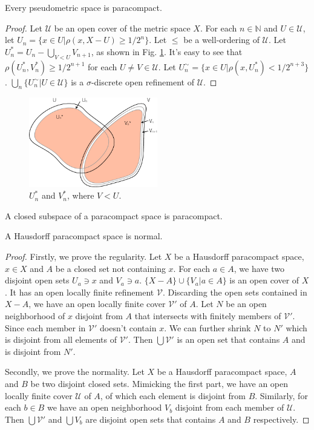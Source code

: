 \documentclass[12pt]{book}
\begin{document}
\begin{theorem}[Stone]
	Every pseudometric space is paracompact.
	\label{thm:paracomp}
\end{theorem}
\begin{proof}
	Let $\mathcal U$ be an open cover of the metric space $X$. For each $n\in\mathbb N$ and $U\in\mathcal U$, let $U_n=\{x\in U|\rho(x,X-U)\geq 1/2^n\}$. Let $\leq$ be a well-ordering of $\mathcal U$. Let $U^*_n=U_n-\bigcup_{V<U}V_{n+1}$, as shown in Fig. \ref{fig:paracompact}. It's easy to see that $\rho(U^*_n,V^*_n)\geq 1/2^{n+1}$ for each $U\neq V\in\mathcal U$. Let $U_n^\sim=\{x\in U|\rho(x,U_n^*)< 1/2^{n+3}\}$. $\bigcup_n\{U_n^\sim|U\in\mathcal U\}$ is a $\sigma$-discrete open refinement of $\mathcal U$.
\end{proof}
\begin{figure}[htb!]
	\centering  
	\includegraphics[width=0.5\textwidth ]{resources/chap_compact/paracompact.pdf}  
	\caption{$U^*_n$ and $V^*_n$, where $V<U$.}
	\label{fig:paracompact}
\end{figure}

\begin{theorem}
	A closed subspace of a paracompact space is paracompact.
\end{theorem}

\begin{theorem}
	A Hausdorff paracompact space is normal.
\end{theorem}
\begin{proof}
	Firstly, we prove the regularity. Let $X$ be a Hausdorff paracompact space, $x\in X$ and $A$ be a closed set not containing $x$. For each $a\in A$, we have two disjoint open sets $U_a\ni x$ and $V_a\ni a$. $\{X-A\}\cup\{V_a|a\in A\}$ is an open cover of $X$. It has an open locally finite refinement $\mathcal V$. Discarding the open sets contained in $X-A$, we have an open locally finite cover $\mathcal V'$ of $A$. Let $N$ be an open neighborhood of $x$ disjoint from $A$ that intersects with finitely members of $\mathcal V'$. Since each member in $\mathcal V'$ doesn't contain $x$. We can further shrink $N$ to $N'$ which is disjoint from all elements of $\mathcal V'$. Then $\bigcup\mathcal V'$ is an open set that contains $A$ and is disjoint from $N'$.
	
	Secondly, we prove the normality. Let $X$ be a Hausdorff paracompact space, $A$ and $B$ be two disjoint closed sets. Mimicking the first part, we have an open locally finite cover $\mathcal U$ of $A$, of which each element is disjoint from $B$. Similarly, for each $b\in B$ we have an open neighborhood $V_b$ disjoint from each member of $\mathcal U$. Then $\bigcup\mathcal V'$ and $\bigcup V_b$ are disjoint open sets that contains $A$ and $B$ respectively.
\end{proof}
\end{document}
